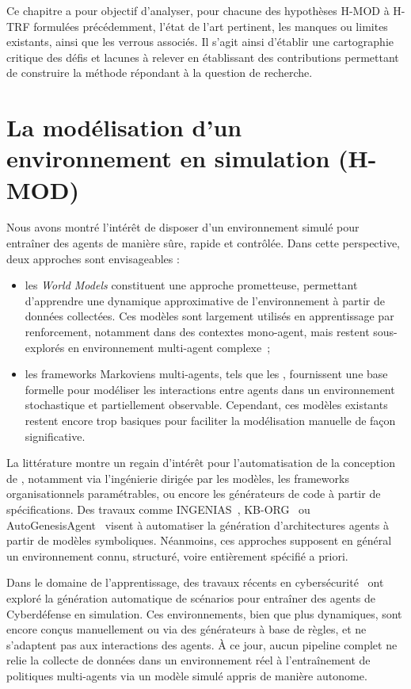 Ce chapitre a pour objectif d'analyser, pour chacune des hypothèses H-MOD à H-TRF formulées précédemment, l'état de l'art pertinent, les manques ou limites existants, ainsi que les verrous associés. Il s'agit ainsi d'établir une cartographie critique des défis et lacunes à relever en établissant des contributions permettant de construire la méthode répondant à la question de recherche.


\section{La modélisation d'un environnement en simulation (H-MOD)}

\noindent
Nous avons montré l'intérêt de disposer d'un environnement simulé pour entraîner des agents de manière sûre, rapide et contrôlée. Dans cette perspective, deux approches sont envisageables :

\begin{itemize}
  \item les \textit{World Models} constituent une approche prometteuse, permettant d'apprendre une dynamique approximative de l'environnement à partir de données collectées. Ces modèles sont largement utilisés en apprentissage par renforcement, notamment dans des contextes mono-agent, mais restent sous-explorés en environnement multi-agent complexe~;
  \item les frameworks Markoviens multi-agents, tels que les , fournissent une base formelle pour modéliser les interactions entre agents dans un environnement stochastique et partiellement observable. Cependant, ces modèles existants restent encore trop basiques pour faciliter la modélisation manuelle de façon significative.
\end{itemize}

\noindent
La littérature montre un regain d'intérêt pour l'automatisation de la conception de , notamment via l'ingénierie dirigée par les modèles, les frameworks organisationnels paramétrables, ou encore les générateurs de code à partir de spécifications. Des travaux comme INGENIAS~\cite{Pavon2003}, KB-ORG~\cite{Sims2008} ou AutoGenesisAgent~\cite{harper2024autogenesisagent} visent à automatiser la génération d'architectures agents à partir de modèles symboliques. Néanmoins, ces approches supposent en général un environnement connu, structuré, voire entièrement spécifié a priori.

\noindent
Dans le domaine de l'apprentissage, des travaux récents en cybersécurité~\cite{hammar2023scalable} ont exploré la génération automatique de scénarios pour entraîner des agents de Cyberdéfense en simulation. Ces environnements, bien que plus dynamiques, sont encore conçus manuellement ou via des générateurs à base de règles, et ne s'adaptent pas aux interactions des agents. À ce jour, aucun pipeline complet ne relie la collecte de données dans un environnement réel à l'entraînement de politiques multi-agents via un modèle simulé appris de manière autonome.

